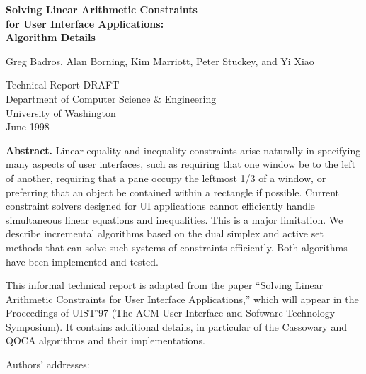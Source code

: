 \documentclass{article}
\begin{document}
\vspace*{27 mm}

\begin{center}
{\Large\bf Solving Linear Arithmetic Constraints \\
       for User Interface Applications: \\
\vspace*{1mm}
       Algorithm Details} \\ 
\vspace*{5 mm}

Greg Badros, Alan Borning, Kim Marriott, Peter Stuckey, and Yi Xiao  \\

\vspace*{5 mm}

Technical Report DRAFT \\
Department of Computer Science \& Engineering \\
University of Washington \\
June 1998  \\
\end{center}

\vspace*{7 mm}

{\large {\bf Abstract.}} 
Linear equality and inequality constraints arise naturally in specifying
many aspects of user interfaces, such as requiring that one window be to
the left of another, requiring that a pane occupy the leftmost 1/3 of a
window, or preferring that an object be contained within a rectangle if
possible.  Current constraint solvers designed for UI applications cannot
efficiently handle simultaneous linear equations and inequalities.  This is
a major limitation.  We describe incremental algorithms based on the dual
simplex and active set methods that can solve such systems of constraints
efficiently.  Both algorithms have been implemented and tested.

This informal technical report is adapted from the paper ``Solving Linear
Arithmetic Constraints for User Interface Applications,'' which will appear
in the Proceedings of UIST'97 (The ACM User Interface and Software
Technology Symposium).  It contains additional details, in particular of
the Cassowary and QOCA algorithms and their implementations.


\vspace*{2 mm}

Authors' addresses:
\end{document}
